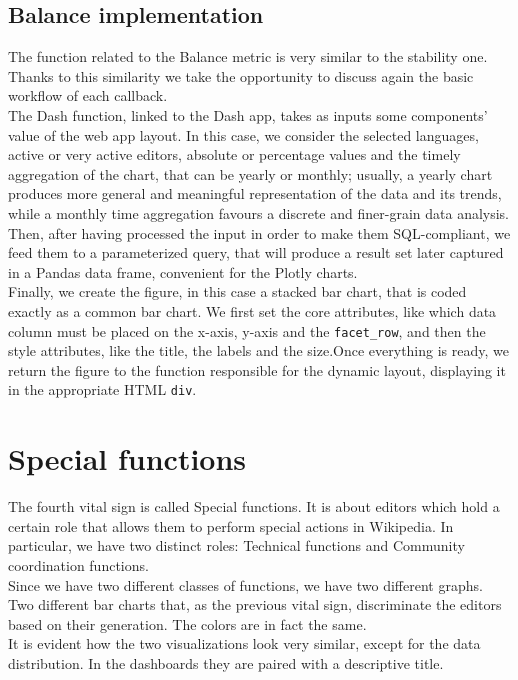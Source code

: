 \subsection{Balance implementation}
\label{sec:balance_callback}

The function related to the Balance metric is very similar to the stability one. Thanks to this similarity we take the opportunity to discuss again the basic workflow of each callback.\\
The Dash function, linked to the Dash app, takes as inputs some components' value of the web app layout. In this case, we consider the selected languages, active or very active editors, absolute or percentage values and the timely aggregation of the chart, that can be yearly or monthly; usually, a yearly chart produces more general and meaningful representation of the data and its trends, while a monthly time aggregation favours a discrete and finer-grain data analysis.\\
Then, after having processed the input in order to make them SQL-compliant, we feed them to a parameterized query, that will produce a result set later captured in a Pandas data frame, convenient for the Plotly charts.\\
Finally, we create the figure, in this case a stacked bar chart, that is coded exactly as a common bar chart. We first set the core attributes, like which data column must be placed on the x-axis, y-axis and the \verb#facet_row#, and then the style attributes, like the title, the labels and the size.Once everything is ready, we return the figure to the function responsible for the dynamic layout, displaying it in the appropriate HTML \verb#div#.

\section{Special functions}
\label{sec:special_functions}

The fourth vital sign is called Special functions. It is about editors which hold a certain role that allows them to perform special actions in Wikipedia. In particular, we have two distinct roles: Technical functions and Community coordination functions.\\
Since we have two different classes of functions, we have two different graphs. Two different bar charts that, as the previous vital sign, discriminate the editors based on their generation. The colors are in fact the same.\\
It is evident how the two visualizations look very similar, except for the data distribution. In the dashboards they are paired with a descriptive title.\\

